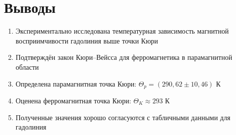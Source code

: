 \documentclass[a4paper]{article}
\begin{document}
\section*{Выводы}

\begin{enumerate}
    \item Экспериментально исследована температурная зависимость магнитной восприимчивости гадолиния выше точки Кюри
    \item Подтверждён закон Кюри–Вейсса для ферромагнетика в парамагнитной области
    \item Определена парамагнитная точка Кюри: $\Theta_p = (290,\!62 \pm 10,\!46)$ К
    \item Оценена ферромагнитная точка Кюри: $\Theta_K \approx 293$ К
    \item Полученные значения хорошо согласуются с табличными данными для гадолиния
\end{enumerate}
\end{document}
